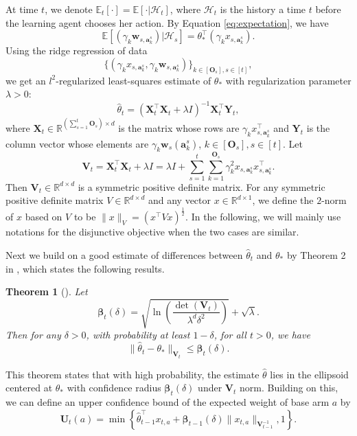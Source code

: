 \documentclass{article}
\newcommand{\bbeta}{\boldsymbol{\beta}}
\newcommand{\EE}{\mathbb{E}}
\newcommand{\RR}{\mathbb{R}}
\newcommand{\ba}{\mathbf{a}}
\newcommand{\bO}{\mathbf{O}}
\newcommand{\bU}{\mathbf{U}}
\newcommand{\bV}{\mathbf{V}}
\newcommand{\bw}{\mathbf{w}}
\newcommand{\bX}{\mathbf{X}}
\newcommand{\bY}{\mathbf{Y}}
\newcommand{\cH}{\mathcal{H}}
\newcommand{\norm}[1]{\| #1 \|}
\newtheorem{theorem}{Theorem}[section]
\newcommand{\wei}[1]{}
\newcommand{\wei}[1]{{\color{blue!50!black}  [\text{Wei:} #1]}}
\begin{document}
At time $t$, we denote $\EE_t[\cdot] = \EE[\cdot | \cH_t]$, where $\cH_t$ is the history a time $t$ before the learning agent
	chooses her action. 
By Equation \eqref{eq:expectation}, we have 
$$
\EE[(\gamma_k \bw_{s,\ba_k^s}) | \cH_{s}] = \theta_*^{\top} (\gamma_k x_{s,\ba_k^s}).
$$
Using the ridge regression of data 
$$
\{(\gamma_k x_{s,\ba_k^s}, \gamma_k \bw_{s,\ba_k^s})\}_{k \in[\bO_s], s\in[t]},
$$
we get an $l^2$-regularized least-squares estimate of $\theta_*$ with regularization parameter $\lambda > 0$:
\begin{equation}
\hat{\theta}_t = (\bX_t^{\top}\bX_t + \lambda I)^{-1} \bX_t^{\top} \bY_t,
\end{equation}
where $\bX_t \in \RR^{(\sum_{s=1}^{t}\bO_s) \times d}$ is the matrix whose rows are $\gamma_k x_{s,\ba_k^s}^{\top}$ and $\bY_t$ is the column vector whose elements are $\gamma_k \bw_s(\ba_k^s)$, $k \in[\bO_s], s\in[t]$. Let
$$
\bV_t = \bX_t^{\top} \bX_t + \lambda I = \lambda I + \sum_{s=1}^{t} \sum_{k=1}^{\bO_s} \gamma_k^2 x_{s,\ba_k^s}x_{s,\ba_k^s}^{\top}.
$$
Then $\bV_t \in \RR^{d \times d}$ is a symmetric positive definite matrix. 
For any symmetric positive definite matrix $V \in \RR^{d \times d} $ and any
	vector $x \in \RR^{d \times 1}$, we define the $2$-norm of $x$ based on
	$V$ to be $\norm{x}_V = (x^{\top} V x)^{\frac{1}{2}}$.
In the following, we will mainly use notations for the disjunctive objective when the two cases are similar.

Next we build on a good estimate of differences between $\hat{\theta}_t$ and $\theta_*$ by Theorem 2 in \cite{abbasi2011improved}, which states the following results.
	
\begin{theorem}[\cite{abbasi2011improved}]
\label{thm:theta_estimate}
Let 
$$
\bbeta_{t}(\delta) = \sqrt{\ln\left(\frac{\det(\bV_{t})}{\lambda^d \delta^2}\right)} + \sqrt{\lambda}.
$$
Then for any $\delta > 0$, with probability at least $1 - \delta$, for all $t > 0$, we have
\begin{equation}
\label{eq:estimateTheta}
\norm{\hat{\theta}_t - \theta_{\ast}}_{\bV_{t}} \leq \bbeta_{t}(\delta).
\end{equation}
\end{theorem}

This theorem states that with high probability, the estimate $\hat{\theta}$ lies in the ellipsoid centered at $\theta_*$  with confidence radius $\bbeta_t(\delta)$ under $\bV_t$ norm. Building on this, we can define an upper confidence bound of the expected weight of base arm $a$ by
\begin{equation}
\label{eq:defU}
\bU_t(a) = \min\left\{\hat{\theta}_{t-1}^{\top}x_{t,a} + \bbeta_{t-1}(\delta)\norm{x_{t,a}}_{\bV_{t-1}^{-1}}, 1 \right\}.
\end{equation}
\end{document}
